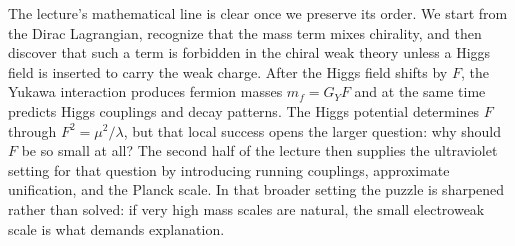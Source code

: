 The lecture's mathematical line is clear once we preserve its order. We start from the Dirac Lagrangian, recognize that the mass term mixes chirality, and then discover that such a term is forbidden in the chiral weak theory unless a Higgs field is inserted to carry the weak charge. After the Higgs field shifts by \(F\), the Yukawa interaction produces fermion masses \(m_f=G_YF\) and at the same time predicts Higgs couplings and decay patterns. The Higgs potential determines \(F\) through \(F^2=\mu^2/\lambda\), but that local success opens the larger question: why should \(F\) be so small at all? The second half of the lecture then supplies the ultraviolet setting for that question by introducing running couplings, approximate unification, and the Planck scale. In that broader setting the puzzle is sharpened rather than solved: if very high mass scales are natural, the small electroweak scale is what demands explanation.